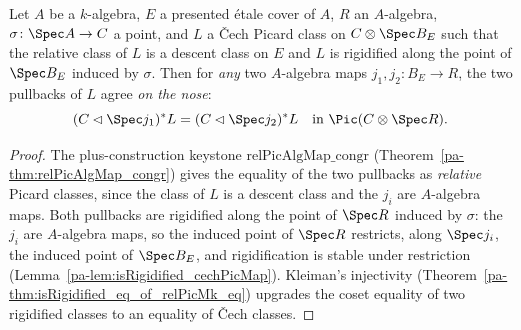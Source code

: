 \begin{theorem}
  \label{pa-thm:isRigidified_cechPicMap_congr}
  \leanok

  Let \(A\) be a \(k\)-algebra, \(E\) a presented \'etale cover of \(A\), \(R\) an
  \(A\)-algebra, \(\sigma \colon \Spec A \to C\) a point, and \(L\) a \v Cech Picard class on
  \(C \otimes \Spec B_E\) such that the relative class of \(L\) is a descent class on \(E\)
  and \(L\) is rigidified along the point of \(\Spec B_E\) induced by \(\sigma\). Then for
  \emph{any} two \(A\)-algebra maps \(j_1, j_2 \colon B_E \to R\), the two pullbacks of \(L\)
  agree \emph{on the nose}:
  \[
    (C \lhd \Spec j_1)^{*} L = (C \lhd \Spec j_2)^{*} L \quad\text{in } \Pic(C \otimes \Spec R).
  \]
\end{theorem}
\begin{proof}
  \leanok
  The plus-construction keystone \(\mathrm{relPicAlgMap\_congr}\)
  (Theorem~\ref{pa-thm:relPicAlgMap_congr}) gives the equality of the two pullbacks as
  \emph{relative} Picard classes, since the class of \(L\) is a descent class and the
  \(j_i\) are \(A\)-algebra maps. Both pullbacks are rigidified along the point of
  \(\Spec R\) induced by \(\sigma\): the \(j_i\) are \(A\)-algebra maps, so the induced point
  of \(\Spec R\) restricts, along \(\Spec j_i\), the induced point of \(\Spec B_E\), and
  rigidification is stable under restriction (Lemma~\ref{pa-lem:isRigidified_cechPicMap}).
  Kleiman's injectivity (Theorem~\ref{pa-thm:isRigidified_eq_of_relPicMk_eq}) upgrades the
  coset equality of two rigidified classes to an equality of \v Cech classes.
\end{proof}

